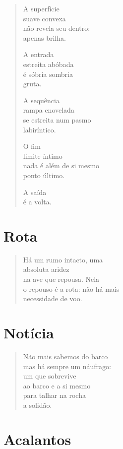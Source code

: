 \begin{verse}
A superfície\\
suave convexa\\
não revela seu dentro:\\
apenas brilha.

A entrada\\
estreita abóbada\\
é sóbria sombria\\
gruta.

A sequência\\
rampa enovelada\\
se estreita num pasmo\\
labiríntico.

O fim\\
limite íntimo\\
nada é além de si mesmo\\
ponto último.

A saída\\
é a volta.
\end{verse}

\chapter{Rota}

\begin{verse}
Há um rumo intacto, uma\\
absoluta aridez\\
na ave que repousa. Nela\\
o repouso é a rota: não há mais\\
necessidade de voo.
\end{verse}

\chapter{Notícia}

\begin{verse}
Não mais sabemos do barco\\
mas há sempre um náufrago:\\
um que sobrevive\\
ao barco e a si mesmo\\
para talhar na rocha\\
a solidão.
\end{verse}

\chapter{Acalantos}

